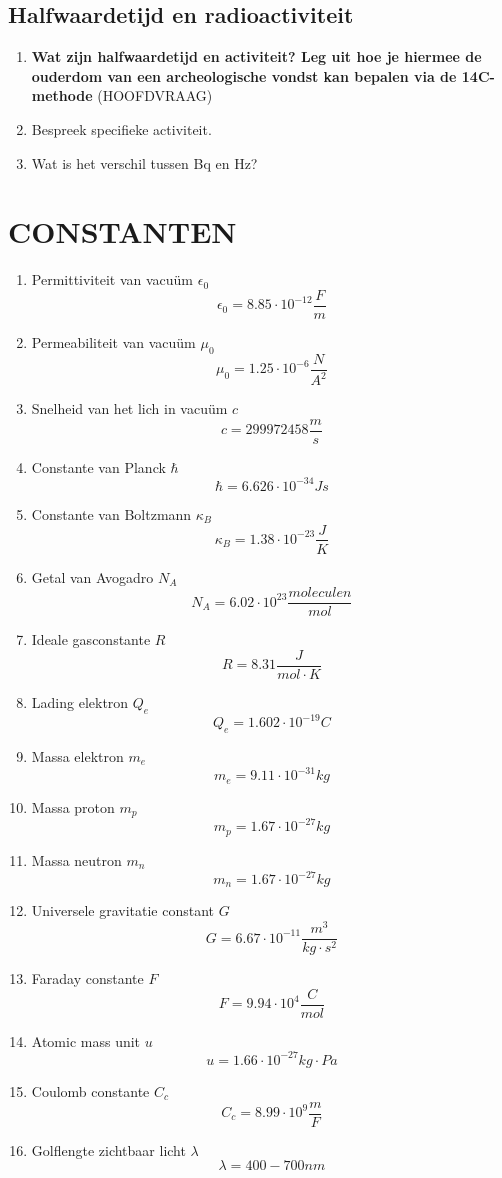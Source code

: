 \documentclass[a4paper,12pt]{article}
\begin{document}
    \subsection{Halfwaardetijd en radioactiviteit}                                                                                                                                                                     
    \begin{enumerate}
        \item \textbf{Wat zijn halfwaardetijd en activiteit? Leg uit hoe je hiermee de ouderdom van een archeologische vondst kan bepalen via de 14C-methode} (HOOFDVRAAG)
        \item Bespreek specifieke activiteit.
        \item Wat is het verschil tussen Bq en Hz?
    \end{enumerate}
    

    \section{CONSTANTEN}
    \begin{enumerate}
        \item Permittiviteit van vacuüm $\epsilon_0$ $$\epsilon_0 = 8.85 \cdot 10^{-12} \frac{F}{m}$$
        \item Permeabiliteit van vacuüm $\mu_0$ $$\mu_0 = 1.25 \cdot 10^{-6} \frac{N}{A^2}$$
        \item Snelheid van het lich in vacuüm $c$ $$c = 299 972 458 \frac{m}{s}$$
        \item Constante van Planck $\hbar$ $$\hbar = 6.626  \cdot 10^{-34} Js$$
        \item Constante van Boltzmann $\kappa_B$ $$\kappa_B = 1.38 \cdot 10^{-23} \frac{J}{K}$$
        \item Getal van Avogadro $N_A$ $$N_A = 6.02 \cdot 10^{23} \frac{moleculen}{mol}$$
        \item Ideale gasconstante $R$ $$R= 8.31 \frac{J}{mol \cdot K}$$
        \item Lading elektron $Q_e$ $$Q_e = 1.602 \cdot 10^{-19} C$$
        \item Massa elektron $m_e$ $$m_e = 9.11 \cdot 10^{-31} kg$$
        \item Massa proton $m_p$ $$m_p = 1.67 \cdot 10^{-27} kg$$
        \item Massa neutron $m_n$ $$m_n = 1.67 \cdot 10^{-27} kg$$
        \item Universele gravitatie constant $G$ $$G=6.67 \cdot 10^{-11} \frac{m^3}{kg \cdot s^2}$$
        \item Faraday constante $F$ $$F=9.94 \cdot 10^{4} \frac{C}{mol}$$
        \item Atomic mass unit $u$ $$u= 1.66 \cdot 10^{-27}kg \cdot Pa$$
        \item Coulomb constante $C_c$ $$C_c = 8.99 \cdot 10^{9} \frac{m}{F}$$
        \item Golflengte zichtbaar licht $\lambda$ $$\lambda = 400 - 700 nm$$
    \end{enumerate}
\end{document}
